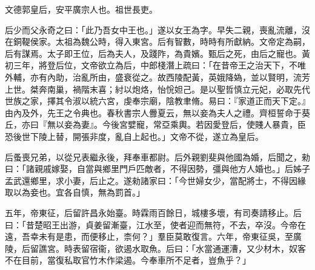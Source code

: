 \begin{pinyinscope}
 
 
 文德郭皇后，安平廣宗人也。祖世長吏。
 
 
 后少而父永奇之曰：「此乃吾女中王也。」遂以女王為字。早失二親，喪亂流離，沒在銅鞮侯家。太祖為魏公時，得入東宮。后有智數，時時有所獻納。文帝定為嗣，后有謀焉。太子即王位，后為夫人，及踐阼，為貴嬪。甄后之死，由后之寵也。黃初三年，將登后位，文帝欲立為后，中郎棧潛上疏曰：「在昔帝王之治天下，不唯外輔，亦有內助，治亂所由，盛衰從之。故西陵配黃，英娥降媯，並以賢明，流芳上世。桀奔南巢，禍階末喜；紂以炮烙，怡恱妲己。是以聖哲慎立元妃，必取先代世族之家，擇其令淑以統六宮，虔奉宗廟，陰教聿脩。易曰：『家道正而天下定。』由內及外，先王之令典也。春秋書宗人釁夏云，無以妾為夫人之禮。齊桓誓命于葵丘，亦曰『無以妾為妻』。今後宮嬖寵，常亞乘輿。若因愛登后，使賤人暴貴，臣恐後世下陵上替，開張非度，亂自上起也。」文帝不從，遂立為皇后。
 
 
后蚤喪兄弟，以從兄表繼永後，拜奉車都尉。后外親劉斐與他國為婚，后聞之，勑曰：「諸親戚嫁娶，自當與鄉里門戶匹敵者，不得因勢，彊與他方人婚也。」后姊子孟武還鄉里，求小妻，后止之。遂勑諸家曰：「今世婦女少，當配將士，不得因緣取以為妾也。宜各自慎，無為罰首。」
 
 
 
 
 五年，帝東征，后留許昌永始臺。時霖雨百餘日，城樓多壞，有司奏請移止。后曰：「昔楚昭王出游，貞姜留漸臺，江水至，使者迎而無符，不去，卒沒。今帝在遠，吾幸未有是患，而便移止，柰何？」羣臣莫敢復言。六年，帝東征吳，至廣陵，后留譙宮。時表留宿衞，欲遏水取魚。后曰：「水當通運漕，又少材木，奴客不在目前，當復私取官竹木作梁遏。今奉車所不足者，豈魚乎？」
 

\end{pinyinscope}
